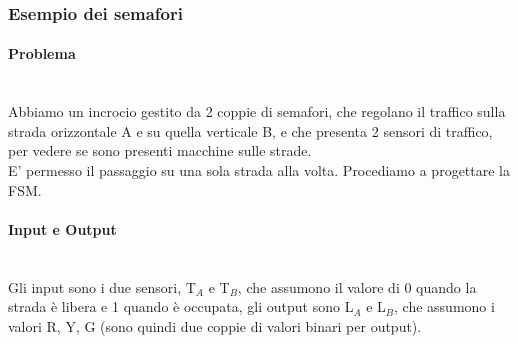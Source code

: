 \documentclass{report}
\newcommand{\subsubsubsection}[1]{\paragraph{#1}\mbox{}\\}
\begin{document}
        \subsubsection{Esempio dei semafori}
            \subsubsubsection{Problema}
                Abbiamo un incrocio gestito da 2 coppie di semafori, che
                regolano il traffico sulla strada orizzontale A e su quella verticale B,
                e che presenta 2 sensori di traffico, per vedere se sono presenti macchine
                sulle strade. \\
                E' permesso il passaggio su una sola strada alla volta.
                Procediamo a progettare la FSM.
            \subsubsubsection{Input e Output}
                Gli input sono i due sensori, T$_A$ e T$_B$, che assumono il valore
                di 0 quando la strada è libera e 1 quando è occupata, gli output sono
                L$_A$ e L$_B$, che assumono i valori R, Y, G (sono quindi due coppie di valori 
                binari per output).
\end{document}
